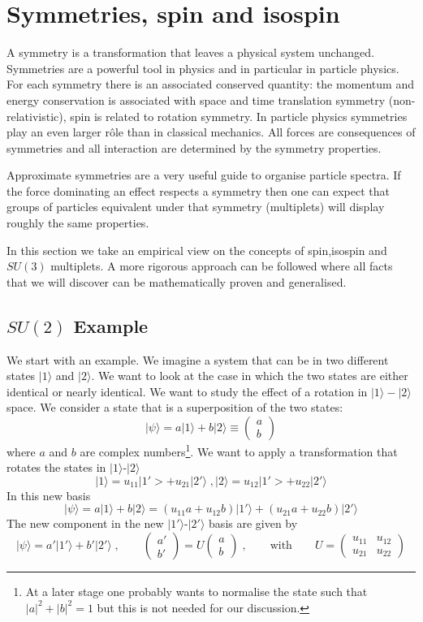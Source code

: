 \documentclass[12pt]{article}
\begin{document}
\section{Symmetries, spin and isospin}\label{sec:Symmetries}
A symmetry is a transformation that leaves a physical system unchanged. Symmetries are a powerful tool in physics and in particular in particle physics. For each symmetry there is an associated conserved quantity: the momentum and energy conservation is associated with space and time translation symmetry (non-relativistic), spin is related to rotation symmetry. In particle physics symmetries play an even larger r\^ole than in classical mechanics. All forces are consequences of symmetries and all interaction are determined by the symmetry properties.

Approximate symmetries are a very useful guide to organise particle spectra. If the force dominating an effect respects a symmetry then one can expect that groups of particles equivalent under that symmetry (multiplets) will display roughly the same properties.

In this section we take an empirical view on the concepts of spin,isospin and $SU(3)$ multiplets. A more rigorous approach can be followed where all facts that we will discover can be mathematically proven and generalised. 

\subsection{$SU(2)$ Example}
We start with an example. We imagine a system that can be in two different states $|1\rangle$ and $|2\rangle$. We want to look at the case in which the two states are either identical or nearly identical. We want to study the effect of a rotation in $|1\rangle-|2\rangle$ space. We consider a state that is a superposition of the two states:
\[|\psi\rangle =a |1\rangle+b|2\rangle\equiv\left(\begin{array}{cc}a\\b\end{array}\right)\]
  where $a$ and $b$ are complex numbers\footnote{At a later stage one probably wants to normalise the state such that $|a|^2+|b|^2=1$ but this is not needed for our discussion.}. We want to apply a transformation that rotates the states in $|1\rangle$-$|2\rangle$
\[|1\rangle=u_{11}|1'>+u_{21}|2'\rangle\;,
  |2\rangle=u_{12}|1'>+u_{22}|2'\rangle  \]
  In this new basis
  \[|\psi\rangle=a|1\rangle + b |2\rangle= (u_{11}a +u_{12}b)|1'\rangle +(u_{21}a +u_{22}b)|2'\rangle   \]
  The new component in the new $|1'\rangle$-$|2'\rangle$ basis are given by
  \[|\psi\rangle =a'|1'\rangle +b'|2'\rangle\;,\qquad \left(\begin{array}{c}a'\\b'\end{array}\right)=U\left(\begin{array}{c}a\\b\end{array}\right)\;,\qquad\mbox{with}\qquad U=\left(\begin{array}{cc}u_{11}&u_{12}\\u_{21}& u_{22} \end{array}\right)\]
\end{document}
